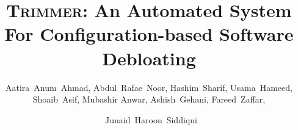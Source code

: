 \documentclass[10pt,journal,compsoc]{IEEEtran}
\def\TOOL{\textsc{Trimmer}}
\begin{document}
\title{\TOOL{}: An Automated System For Configuration-based Software Debloating}  %
\author{Aatira~Anum~Ahmad,
       Abdul~Rafae~Noor,
       Hashim~Sharif,
       Usama~Hameed,
       Shoaib~Asif,
       Mubashir Anwar,
       Ashish~Gehani,
       Fareed~Zaffar,
     \and~Junaid~Haroon~Siddiqui} %



\maketitle
\newcommand\hashim[1]{{\color{cyan}\textbf{HS: #1}}}
\newcommand\shoaib[1]{{\color{red}\textbf{Shoaib: #1}}}
\newcommand\rafae[1]{{\color{black}\textbf{Rafae: #1}}}
\newcommand\AG[1]{{\color{blue}\textbf{AG}: #1}}
\newcommand\aatira[1]{{\color{green}\textbf{Aatira}: #1}}
\newcommand\mubashir[1]{{\color{magenta}\textbf{Mubashir: #1}}}
\end{document}

